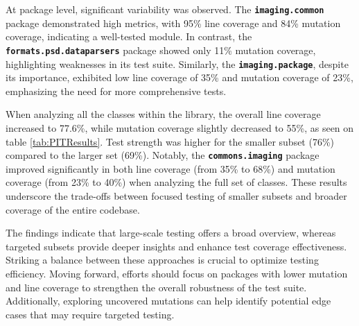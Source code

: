 \documentclass[sigconf]{acmart}
\begin{document}
At package level, significant variability was observed. The \textbf{\texttt{imagi\allowbreak ng.common}} package demonstrated high metrics, with 95\% line coverage and 84\% mutation coverage, indicating a well-tested module. In contrast, the \textbf{\texttt{formats.psd.dataparsers}} package showed only 11\% mutation coverage, highlighting weaknesses in its test suite. Similarly, the \textbf{\texttt{imaging.package}}, despite its importance, exhibited low line coverage of 35\% and mutation coverage of 23\%, emphasizing the need for more comprehensive tests.

\begin{table}[h!]
\centering
{}
\caption{PIT Mutation Testing Results}
\label{tab:PITResults}
\end{table}

When analyzing all the classes within the library, the overall line coverage increased to 77.6\%, while mutation coverage slightly decreased to 55\%, as seen on table \ref{tab:PITResults}. Test strength was higher for the smaller subset (76\%) compared to the larger set (69\%). Notably, the \textbf{\texttt{commons.\allowbreak imaging}} package improved significantly in both line coverage (from 35\% to 68\%) and mutation coverage (from 23\% to 40\%) when analyzing the full set of classes. These results underscore the trade-offs between focused testing of smaller subsets and broader coverage of the entire codebase.

The findings indicate that large-scale testing offers a broad overview, whereas targeted subsets provide deeper insights and enhance test coverage effectiveness. Striking a balance between these approaches is crucial to optimize testing efficiency. Moving forward, efforts should focus on packages with lower mutation and line coverage to strengthen the overall robustness of the test suite. Additionally, exploring uncovered mutations can help identify potential edge cases that may require targeted testing.
\end{document}
